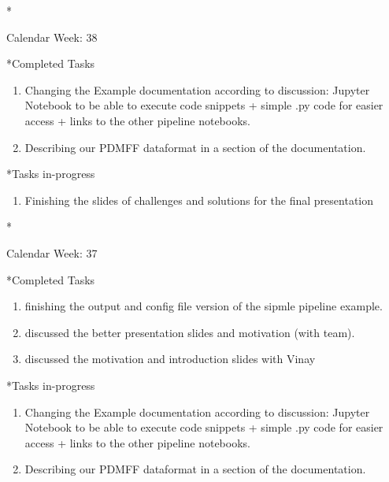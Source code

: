 \documentclass[11pt,a4paper]{article}
\begin{document}
\begin{section}
\begin{subsection}
	\end{subsection}

\end{section}

\newpage
\begin{section}*{Calendar Week: 38 \hfill \date{24 September, 2021}}
	
	\begin{subsection}*{Completed Tasks}
		\begin{enumerate}
			\item Changing the Example documentation according to discussion: Jupyter Notebook to be able to execute code snippets + simple .py code for easier access + links to the other pipeline notebooks.
			\item Describing our PDMFF dataformat in a section of the documentation.
		\end{enumerate}
	\end{subsection}
	
	\begin{subsection}*{Tasks in-progress}
		\begin{enumerate}
			\item Finishing the slides of challenges and solutions for the final presentation
		\end{enumerate}
	\end{subsection}
	
\end{section}

\newpage
\begin{section}*{Calendar Week: 37 \hfill \date{17 September, 2021}}
	
	\begin{subsection}*{Completed Tasks}
		\begin{enumerate}
			\item finishing the output and config file version of the sipmle pipeline example.
			\item discussed the better presentation slides and motivation (with team).
			\item discussed the motivation and introduction slides with Vinay
		\end{enumerate}
	\end{subsection}
	
	\begin{subsection}*{Tasks in-progress}
		\begin{enumerate}
			\item Changing the Example documentation according to discussion: Jupyter Notebook to be able to execute code snippets + simple .py code for easier access + links to the other pipeline notebooks.
			\item Describing our PDMFF dataformat in a section of the documentation.
		\end{enumerate}
	\end{subsection}
	
\end{section}
\end{document}
